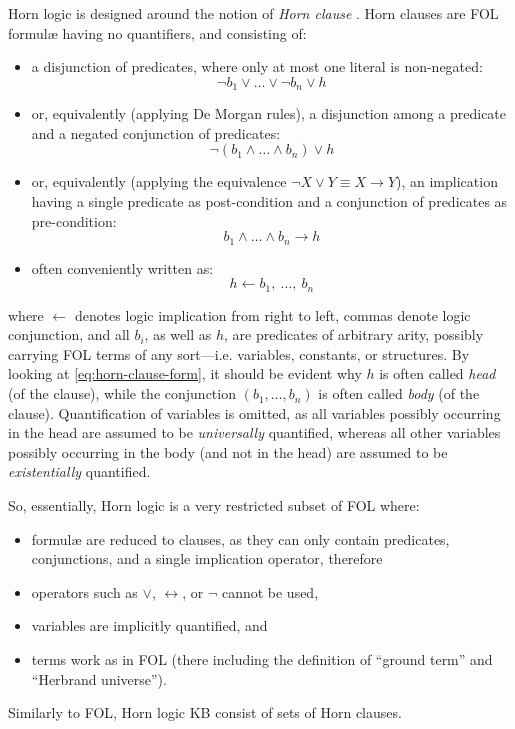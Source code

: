 \documentclass[12pt,a4paper,openright,twoside]{book}
\begin{document}
Horn logic is designed around the notion of \emph{Horn clause} \cite{Horn1951}.
%
Horn clauses are FOL formul\ae{} having no quantifiers, and consisting of:
%
\begin{itemize}
    \item a disjunction of predicates, where only at most one literal is non-negated:
    \begin{equation*}
        \lnot b_1 \vee \ldots \vee \lnot b_n \vee h
    \end{equation*}

    \item or, equivalently (applying De Morgan rules), a disjunction among a predicate and a negated conjunction of predicates:
    \begin{equation*}
        \lnot (b_1 \wedge \ldots \wedge b_n) \vee h
    \end{equation*}

    \item or, equivalently (applying the equivalence $\lnot X \vee Y \equiv X \rightarrow Y$), an implication having a single predicate as post-condition and a conjunction of predicates as pre-condition:
    \begin{equation*}
        b_1 \wedge \ldots \wedge b_n \rightarrow h
    \end{equation*}

    \item often conveniently written as:
    \begin{equation}\label{eq:horn-clause-form}
        h \leftarrow b_1,\ \ldots,\ b_n
    \end{equation}

\end{itemize}
%
where $\leftarrow$ denotes logic implication from right to left, commas denote logic conjunction, and all $b_i$, as well as $h$, are predicates of arbitrary arity, possibly carrying FOL terms of any sort---i.e. variables, constants, or structures.
%
By looking at \cref{eq:horn-clause-form}, it should be evident why $h$ is often called \emph{head} (of the clause), while the conjunction $(b_1, \ldots, b_n)$ is often called \emph{body} (of the clause).
%
Quantification of variables is omitted, as all variables possibly occurring in the head are assumed to be \emph{universally} quantified, whereas all other variables possibly occurring in the body (and not in the head) are assumed to be \emph{existentially} quantified.

So, essentially, Horn logic is a very restricted subset of FOL where:
%
\begin{itemize}
    \item formul\ae{} are reduced to clauses, as they can only contain predicates, conjunctions, and a single implication operator, therefore
    \item operators such as $\vee$, $\leftrightarrow$, or $\lnot$ cannot be used,
    \item variables are implicitly quantified, and
    \item terms work as in FOL (there including the definition of ``ground term'' and ``Herbrand universe'').
\end{itemize}
%
Similarly to FOL, Horn logic KB consist of sets of Horn clauses.
\end{document}
